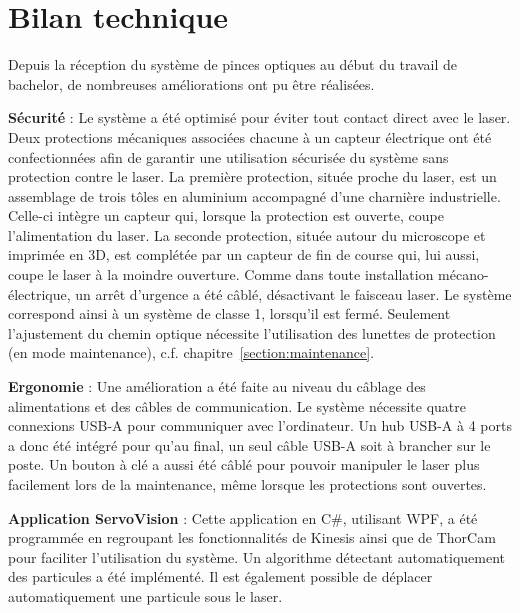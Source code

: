 

\section*{Bilan technique}
Depuis la réception du système de pinces optiques au début du travail de bachelor, de nombreuses améliorations ont pu être réalisées.

\textbf{Sécurité} :
Le système a été optimisé pour éviter tout contact direct avec le laser. Deux protections mécaniques associées chacune à un capteur électrique ont été confectionnées afin de garantir une utilisation sécurisée du système sans protection contre le laser. La première protection, située proche du laser, est un assemblage de trois tôles en aluminium accompagné d'une charnière industrielle. Celle-ci intègre un capteur qui, lorsque la protection est ouverte, coupe l'alimentation du laser. La seconde protection, située autour du microscope et imprimée en 3D, est complétée par un capteur de fin de course qui, lui aussi, coupe le laser à la moindre ouverture. Comme dans toute installation mécano-électrique, un arrêt d'urgence a été câblé, désactivant le faisceau laser. Le système correspond ainsi à un système de classe 1, lorsqu'il est fermé. Seulement l'ajustement du chemin optique nécessite l'utilisation des lunettes de protection (en mode maintenance), c.f. chapitre~\ref{section:maintenance}.

\textbf{Ergonomie} :
Une amélioration a été faite au niveau du câblage des alimentations et des câbles de communication. Le système nécessite quatre connexions USB-A pour communiquer avec l'ordinateur. Un hub USB-A à 4 ports a donc été intégré pour qu'au final, un seul câble USB-A soit à brancher sur le poste. Un bouton à clé a aussi été câblé pour pouvoir manipuler le laser plus facilement lors de la maintenance, même lorsque les protections sont ouvertes.

\textbf{Application ServoVision} :
Cette application en C\#, utilisant WPF, a été programmée en regroupant les fonctionnalités de Kinesis ainsi que de ThorCam pour faciliter l'utilisation du système. Un algorithme détectant automatiquement des particules a été implémenté. Il est également possible de déplacer automatiquement une particule sous le laser.

